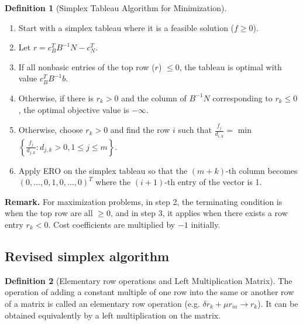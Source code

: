 \documentclass{article}
\theoremstyle{definition}
\newtheorem{definition}{Definition}[section]
\begin{document}
	\begin{definition}[Simplex Tableau Algorithm for Minimization]\hfill
		\begin{enumerate}
			\item Start with a simplex tableau where it is a feasible solution ($f \geq 0$).
			\item Let $r = c_B^TB^{-1}N-c_N^T$.
			\item If all nonbasic entries of the top row ($r$) $\leq 0$, the tableau is optimal with value $c_B^TB^{-1}b$.
			\item Otherwise, if there is $r_k > 0$ and the column of $B^{-1}N$ corresponding to $r_k \leq 0$, the optimal objective value is $-\infty$.
			\item Otherwise, choose $r_k > 0$ and find the row $i$ such that $\displaystyle \frac{f_j}{d_{i,k}} =$ min$\left\{\displaystyle \frac{f_j}{d_{j,k}}: d_{j,k}>0, 1\leq j\leq m\right\}$.
			\item Apply ERO on the simplex tableau so that the $(m+k)$-th column becomes $(0, \dots, 0, 1, 0, \dots, 0)^T$ where the $(i+1)$-th entry of the vector is 1.
		\end{enumerate}
		\textbf{Remark.} For maximization problems, in step 2, the terminating condition is when the top row are all $\geq 0$, and in step 3, it applies when there exists a row entry $r_k < 0$. Cost coefficients are multiplied by $-1$ initially.
	\end{definition}

    \subsection{Revised simplex algorithm}
	\begin{definition}[Elementary row operations and Left Multiplication Matrix]\hfill\break
		The operation of adding a constant multiple of one row into the same or another row of a matrix is called an elementary row operation (e.g. $\delta r_k + \mu r_m \rightarrow r_k$). It can be obtained equivalently by a left multiplication on the matrix.
	\end{definition}
\end{document}
